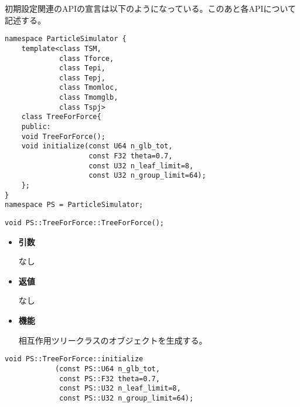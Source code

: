 初期設定関連のAPIの宣言は以下のようになっている。このあと各APIについて
記述する。
\begin{lstlisting}[caption=TreeForForce1]
namespace ParticleSimulator {
    template<class TSM,
             class Tforce,
             class Tepi,
             class Tepj,
             class Tmomloc,
             class Tmomglb,
             class Tspj>
    class TreeForForce{
    public:
    void TreeForForce();
    void initialize(const U64 n_glb_tot,
                    const F32 theta=0.7,
                    const U32 n_leaf_limit=8,
                    const U32 n_group_limit=64);
    };
}
namespace PS = ParticleSimulator;
\end{lstlisting}


\begin{screen}
\begin{verbatim}
void PS::TreeForForce::TreeForForce();
\end{verbatim}
\end{screen}

\begin{itemize}

\item {\bf 引数}

なし

\item {\bf 返値}

なし

\item {\bf 機能}

相互作用ツリークラスのオブジェクトを生成する。

\end{itemize}


\begin{screen}
\begin{verbatim}
void PS::TreeForForce::initialize
            (const PS::U64 n_glb_tot,
             const PS::F32 theta=0.7,
             const PS::U32 n_leaf_limit=8,
             const PS::U32 n_group_limit=64);
\end{verbatim}
\end{screen}

